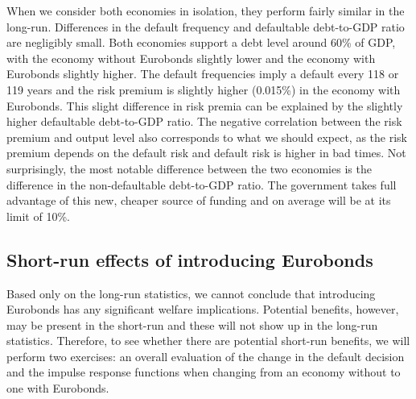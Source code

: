 When we consider both economies in isolation, they perform fairly similar in the long-run. Differences in the default frequency and defaultable debt-to-GDP ratio are negligibly small. Both economies support a debt level around 60\% of GDP, with the economy without Eurobonds slightly lower and the economy with Eurobonds slightly higher. The default frequencies imply a default every 118 or 119 years and the risk premium is slightly higher (0.015\%) in the economy with Eurobonds. This slight difference in risk premia can be explained by the slightly higher defaultable debt-to-GDP ratio. The negative correlation between the risk premium and output level also corresponds to what we should expect, as the risk premium depends on the default risk and default risk is higher in bad times. Not surprisingly, the most notable difference between the two economies is the difference in the non-defaultable debt-to-GDP ratio. The government takes full advantage of this new, cheaper source of funding and on average will be at its limit of 10\%.\\

\subsection{Short-run effects of introducing Eurobonds}
Based only on the long-run statistics, we cannot conclude that introducing Eurobonds has any significant welfare implications. Potential benefits, however, may be present in the short-run and these will not show up in the long-run statistics. Therefore, to see whether there are potential short-run benefits, we will perform two exercises: an overall evaluation of the change in the default decision and the impulse response functions when changing from an economy without to one with Eurobonds.\\

